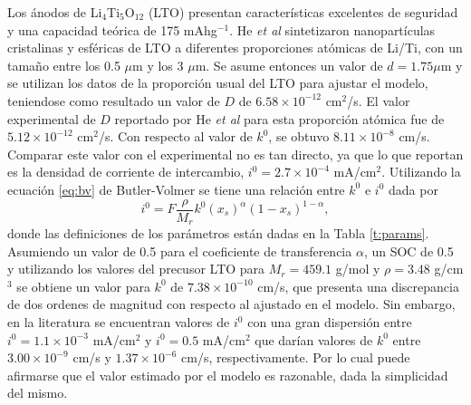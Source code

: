 Los ánodos de Li$_4$Ti$_5$O$_{12}$ (LTO) presentan características excelentes
de seguridad y una capacidad teórica de 175 mAhg$^{-1}$. He \textit{et al} 
\cite{he2012} sintetizaron nanopartículas cristalinas y esféricas de LTO a 
diferentes proporciones atómicas de Li/Ti, con un tamaño entre los 0.5 $\mu$m 
y los 3 $\mu$m. Se asume entonces un valor de $d=1.75 \mu$m y se utilizan los
datos de la proporción usual del LTO para ajustar el modelo, teniendose como 
resultado un valor de $D$ de $6.58\times10^{-12}$ cm$^2$/s. El valor experimental 
de $D$ reportado por He \textit{et al} para esta proporción atómica fue de
$5.12\times10^{-12}$ cm$^2$/s. Con respecto al valor de $k^0$, se obtuvo 
$8.11\times10^{-8}$ cm/s. Comparar este valor con el experimental no es tan 
directo, ya que lo que reportan es la densidad de corriente de intercambio, 
$i^0 = 2.7\times10^{-4}$ mA/cm$^2$. Utilizando la ecuación \ref{eq:bv} de 
Butler-Volmer se tiene una relación entre $k^0$ e $i^0$ dada por
\begin{equation}\label{eq:i0k0}
    i^0 = F \frac{\rho}{M_r} k^0 \left(x_s\right)^{\alpha} \left(1 - x_s\right)^{1-\alpha},
\end{equation}
donde las definiciones de los parámetros están dadas en la Tabla \ref{t:params}.
Asumiendo un valor de 0.5 para el coeficiente de transferencia $\alpha$, un 
SOC de 0.5 y utilizando los valores del precusor LTO para $M_r = 459.1$ g/mol y
$\rho = 3.48$ g/cm$^3$ \cite{osti_1284125} se obtiene un valor para $k^0$ de
$7.38\times10^{-10}$ cm/s, que presenta una discrepancia de dos ordenes de 
magnitud con respecto al ajustado en el modelo. Sin embargo, en la literatura
se encuentran valores de $i^0$ con una gran dispersión entre 
$i^0 = 1.1\times10^{-3}$ mA/cm$^2$ \cite{medina2015} y $i^0 = 0.5$ mA/cm$^2$ 
\cite{umirov2019} que darían valores de $k^0$ entre $3.00\times10^{-9}$ cm/s y 
$1.37\times10^{-6}$ cm/s, respectivamente. Por lo cual puede afirmarse que el 
valor estimado por el modelo es razonable, dada la simplicidad del mismo.

